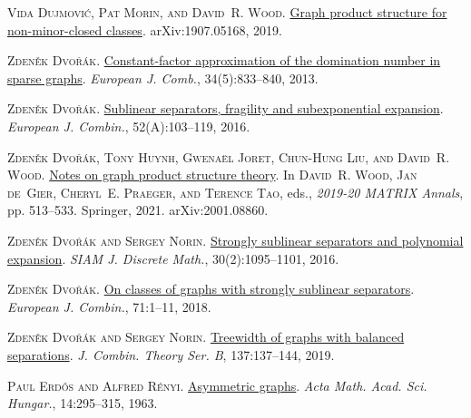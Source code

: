 \documentclass[a4paper,11pt]{article}
\theoremstyle{plain}
\theoremstyle{definition}
\begin{document}
\textsc{Vida Dujmovi{\'c}, Pat Morin, and David~R. Wood}.
\newblock \href{http://arxiv.org/abs/1907.05168}{Graph product structure for
  non-minor-closed classes}.
\newblock arXiv:1907.05168, 2019.

\textsc{Zden{\v{e}}k Dvo{\v{r}}{\'a}k}.
\newblock \href{https://doi.org/10.1016/j.ejc.2012.12.004}{Constant-factor
  approximation of the domination number in sparse graphs}.
\newblock \emph{European J. Comb.}, 34(5):833--840, 2013.

\textsc{Zden{\v{e}}k Dvo{\v{r}}{\'a}k}.
\newblock \href{https://doi.org/10.1016/j.ejc.2015.09.001}{Sublinear
  separators, fragility and subexponential expansion}.
\newblock \emph{European J. Combin.}, 52(A):103--119, 2016.

\textsc{Zden{\v{e}}k Dvo{\v{r}}{\'a}k, Tony Huynh, Gwena\"el Joret, Chun-Hung
  Liu, and David~R. Wood}.
\newblock \href{https://doi.org/10.1007/978-3-030-62497-2_32}{Notes on graph
  product structure theory}.
\newblock In \textsc{David~R. Wood, Jan de~Gier, Cheryl~E. Praeger, and Terence
  Tao}, eds., \emph{2019-20 MATRIX Annals}, pp. 513--533. Springer, 2021.
\newblock arXiv:2001.08860.

\textsc{Zden{\v{e}}k Dvo{\v{r}}{\'a}k and Sergey Norin}.
\newblock \href{https://doi.org/10.1137/15M1017569}{Strongly sublinear
  separators and polynomial expansion}.
\newblock \emph{SIAM J. Discrete Math.}, 30(2):1095--1101, 2016.

\textsc{Zden\v{e}k Dvo\v{r}\'{a}k}.
\newblock \href{https://doi.org/10.1016/j.ejc.2018.02.032}{On classes of graphs
  with strongly sublinear separators}.
\newblock \emph{European J. Combin.}, 71:1--11, 2018.

\textsc{Zden\v{e}k Dvo\v{r}\'{a}k and Sergey Norin}.
\newblock \href{https://doi.org/10.1016/j.jctb.2018.12.007}{Treewidth of graphs
  with balanced separations}.
\newblock \emph{J. Combin. Theory Ser. B}, 137:137--144, 2019.

\textsc{Paul Erd\H{o}s and Alfred R\'{e}nyi}.
\newblock \href{https://doi.org/10.1007/BF01895716}{Asymmetric graphs}.
\newblock \emph{Acta Math. Acad. Sci. Hungar.}, 14:295--315, 1963.
\end{document}
